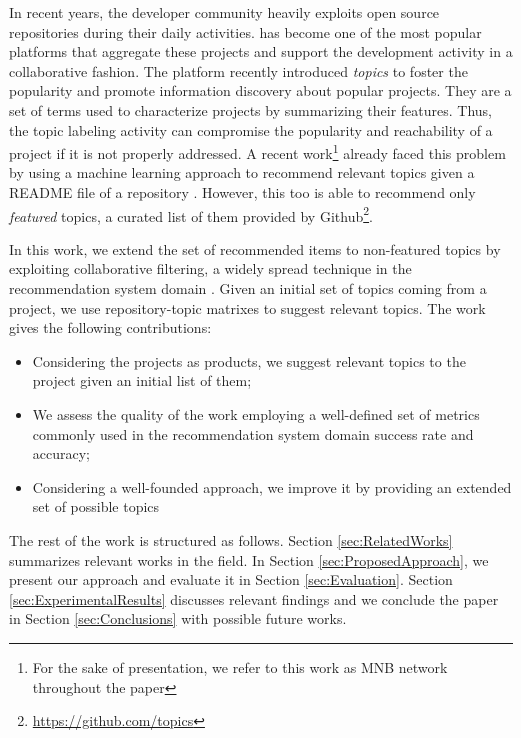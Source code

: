 In recent years, the developer community heavily exploits open source repositories during their daily activities. \GH has become one of the most
popular platforms that aggregate these projects and
support the development activity in a collaborative fashion.
%
The platform recently introduced \emph{topics} to foster the popularity and promote information discovery about popular projects. They are a set of terms used to characterize projects by summarizing their features.  
Thus, the topic labeling activity can compromise the popularity and reachability of a project if it is not properly addressed. A recent work\footnote{For the sake of presentation, we refer to this work as MNB network throughout the paper} already faced this problem by using a machine learning approach to recommend relevant topics given a README file of a repository \cite{10.1145/3383219.3383227}. However, this too is able to recommend only \emph{featured} topics, a curated list of them provided by Github\footnote{\url{https://github.com/topics}}.

In this work, we extend the set of recommended items to non-featured topics by exploiting collaborative filtering, a widely spread technique in the recommendation system domain \cite{Schafer:2007:CFR:1768197.1768208}. Given an initial set of topics coming from a \GH project, we use repository-topic matrixes to suggest relevant topics.
The work gives the following contributions:
\begin{itemize}
\item Considering the \GH projects as products, we suggest relevant topics to the project given an initial list of them;
\item We assess the quality of the work employing a well-defined set of metrics commonly used in the recommendation system domain \ie success rate and accuracy;
\item Considering a well-founded approach, we improve it by providing an extended set of possible topics  
\end{itemize}

The rest of the work is structured as follows. Section \ref{sec:RelatedWorks} summarizes relevant works in the field. In Section \ref{sec:ProposedApproach}, we present our approach and evaluate it in Section \ref{sec:Evaluation}. Section \ref{sec:ExperimentalResults} discusses relevant findings and we conclude the paper in Section \ref{sec:Conclusions} with possible future works.
